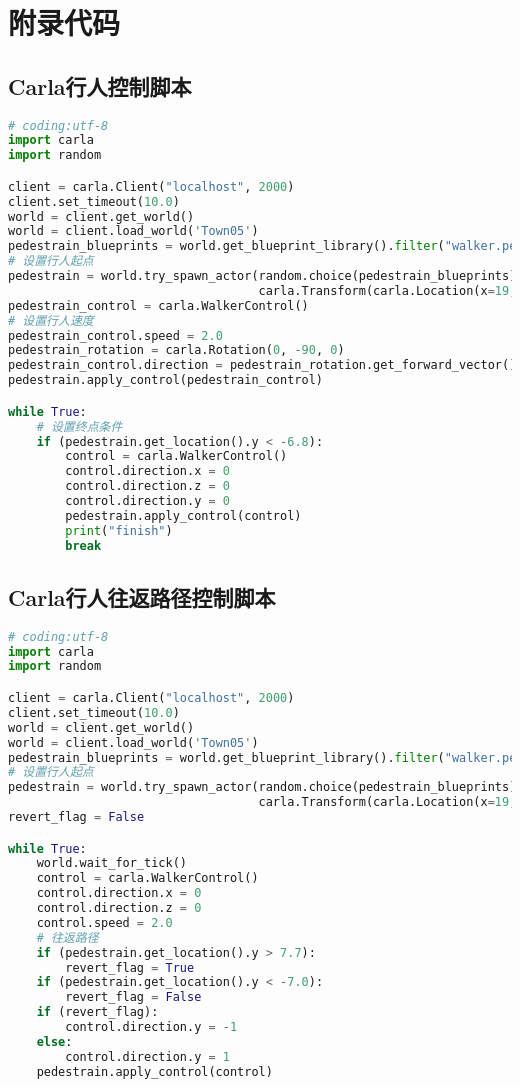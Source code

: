 \chapter{附录代码}

\section{Carla行人控制脚本}

\begin{lstlisting}[language=Python]
# coding:utf-8 
import carla
import random

client = carla.Client("localhost", 2000)
client.set_timeout(10.0)
world = client.get_world()
world = client.load_world('Town05')
pedestrain_blueprints = world.get_blueprint_library().filter("walker.pedestrian.0001")
# 设置行人起点
pedestrain = world.try_spawn_actor(random.choice(pedestrain_blueprints),
                                   carla.Transform(carla.Location(x=19, y=9, z=2), carla.Rotation(yaw=-90)))
pedestrain_control = carla.WalkerControl()
# 设置行人速度
pedestrain_control.speed = 2.0
pedestrain_rotation = carla.Rotation(0, -90, 0)
pedestrain_control.direction = pedestrain_rotation.get_forward_vector()
pedestrain.apply_control(pedestrain_control)

while True:
    # 设置终点条件
    if (pedestrain.get_location().y < -6.8):
        control = carla.WalkerControl()
        control.direction.x = 0
        control.direction.z = 0
        control.direction.y = 0
        pedestrain.apply_control(control)
        print("finish")
        break
\end{lstlisting}

\section{Carla行人往返路径控制脚本}

\begin{lstlisting}[language=Python]
# coding:utf-8 
import carla
import random

client = carla.Client("localhost", 2000)
client.set_timeout(10.0)
world = client.get_world()
world = client.load_world('Town05')
pedestrain_blueprints = world.get_blueprint_library().filter("walker.pedestrian.0001")
# 设置行人起点
pedestrain = world.try_spawn_actor(random.choice(pedestrain_blueprints),
                                   carla.Transform(carla.Location(x=19, y=9, z=2), carla.Rotation(yaw=-90)))
revert_flag = False

while True:
    world.wait_for_tick()
    control = carla.WalkerControl()
    control.direction.x = 0
    control.direction.z = 0
    control.speed = 2.0
    # 往返路径
    if (pedestrain.get_location().y > 7.7):
        revert_flag = True
    if (pedestrain.get_location().y < -7.0):
        revert_flag = False
    if (revert_flag):
        control.direction.y = -1
    else:
        control.direction.y = 1
    pedestrain.apply_control(control)
\end{lstlisting}

